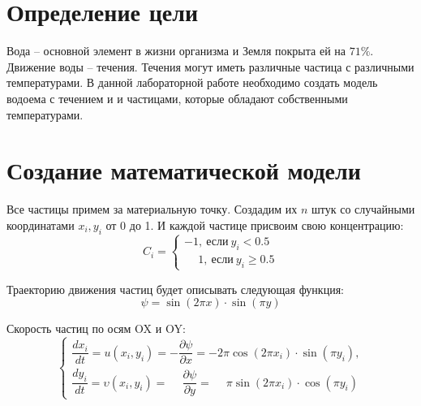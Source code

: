 \documentclass[a4paper, 14pt]{extarticle}
\begin{document}
	\pagebreak	

	\section{Определение цели}
		Вода -- основной элемент в жизни организма и Земля покрыта ей на $71\%$. Движение воды -- течения. Течения могут иметь различные частица с различными температурами. В данной лабораторной работе необходимо создать модель водоема с течением и и частицами, которые обладают собственными температурами.
		
	\section{Создание математической модели}
		Все частицы примем за материальную точку. Создадим их $n$  штук со случайными координатами $x_i, y_i$  от 0 до 1.
		И каждой частице присвоим свою концентрацию:
		\[ C_i = \begin{cases} -1, \ \text{если} \ y_i < 0.5 \\ \phantom{-} 1, \ \text{если} \ y_i \geq 0.5 \end{cases}\]
		
		Траекторию движения частиц будет описывать следующая функция:
		\[ \psi = \sin(2\pi x) \cdot \sin(\pi y) \]
		
		Скорость частиц по осям OX и OY:
		\[ \begin{cases}
				\dfrac{dx_i}{dt} = u(x_i, y_i) = -\dfrac{\partial \psi}{\partial x} = -2\pi \cos(2\pi x_i) \cdot \sin(\pi y_i), \\
				\dfrac{dy_i}{dt} =\upsilon (x_i, y_i) = \phantom{-}\dfrac{\partial \psi}{\partial y} = \phantom{-} \pi \sin(2\pi x_i) \cdot \cos(\pi y_i)
			\end{cases}
		\]
\end{document}
